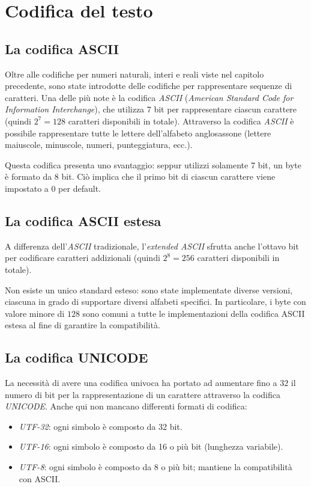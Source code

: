 \documentclass[class=book, crop=false, oneside]{standalone}
\begin{document}
\chapter{Codifica del testo}
\section{La codifica ASCII}
Oltre alle codifiche per numeri naturali, interi e reali viste nel capitolo precedente, sono state introdotte delle codifiche per rappresentare sequenze di caratteri. Una delle più note è la codifica \emph{ASCII} (\emph{American Standard Code for Information Interchange}), che utilizza \(7\) bit per rappresentare ciascun carattere (quindi \(2^7=128\) caratteri disponibili in totale).
Attraverso la codifica \emph{ASCII} è possibile rappresentare tutte le lettere dell'alfabeto anglosassone (lettere maiuscole, minuscole, numeri, punteggiatura, ecc.).

Questa codifica presenta uno svantaggio: seppur utilizzi solamente 7 bit, un byte è formato da 8 bit. Ciò implica che il primo bit di ciascun carattere viene impostato a 0 per default.

\section{La codifica ASCII estesa}
A differenza dell'\emph{ASCII} tradizionale, l'\emph{extended ASCII} sfrutta anche l'ottavo bit per codificare caratteri addizionali (quindi \(2^8=256\) caratteri disponibili in totale).

Non esiste un unico standard esteso: sono state implementate diverse versioni, ciascuna in grado di supportare diversi alfabeti specifici. In particolare, i byte con valore minore di \(128\) sono comuni a tutte le implementazioni della codifica ASCII estesa al fine di garantire la compatibilità.

\section{La codifica UNICODE}
La necessità di avere una codifica univoca ha portato ad aumentare fino a \(32\) il numero di bit per la rappresentazione di un carattere attraverso la codifica \emph{UNICODE}. Anche qui non mancano differenti formati di codifica:
\begin{itemize}[noitemsep]
	\item \emph{UTF-32}: ogni simbolo è composto da 32 bit.
	\item \emph{UTF-16}: ogni simbolo è composto da 16 o più bit (lunghezza variabile).
	\item \emph{UTF-8}: ogni simbolo è composto da 8 o più bit; mantiene la compatibilità con ASCII.
\end{itemize}
\end{document}
